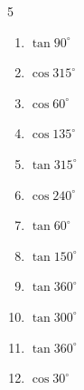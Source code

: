 \begin{multicols}{5}
\begin{enumerate}
        \phantom{$\displaystyle =0$}

  \item $\displaystyle \tan{90^\circ}$

        \phantom{$\displaystyle なし$}

  \item $\displaystyle \cos{315^\circ}$


  \item $\displaystyle \cos{60^\circ}$


  \item $\displaystyle \cos{135^\circ}$


  \item $\displaystyle \tan{315^\circ}$

        \phantom{$\displaystyle =-1$}

  \item $\displaystyle \cos{240^\circ}$


  \item $\displaystyle \tan{60^\circ}$


\columnbreak %

  \item $\displaystyle \tan{150^\circ}$


  \item $\displaystyle \tan{360^\circ}$

        \phantom{$\displaystyle =0$}

  \item $\displaystyle \tan{300^\circ}$


  \item $\displaystyle \tan{360^\circ}$

        \phantom{$\displaystyle =0$}

  \item $\displaystyle \cos{30^\circ}$



\end{enumerate}
\end{multicols}
